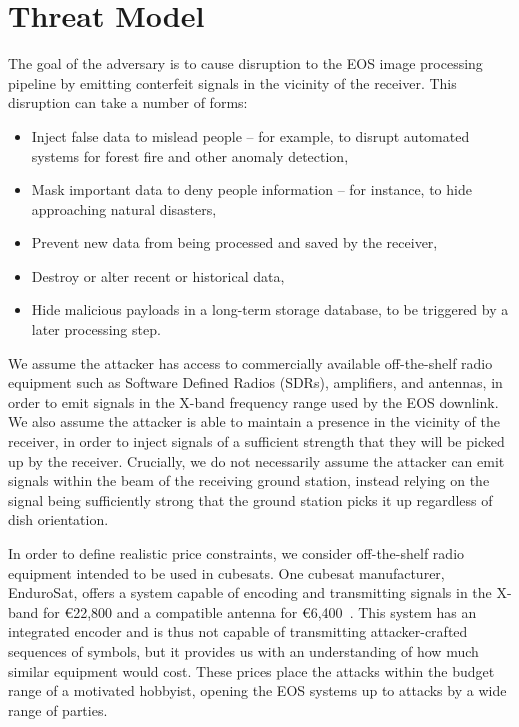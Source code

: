 \section{Threat Model}\label{sec:threat-model}

The goal of the adversary is to cause disruption to the EOS image processing pipeline by emitting conterfeit signals in the vicinity of the receiver.
This disruption can take a number of forms:
\begin{itemize}
    \item Inject false data to mislead people -- for example, to disrupt automated systems for forest fire and other anomaly detection,
    \item Mask important data to deny people information -- for instance, to hide approaching natural disasters,
    \item Prevent new data from being processed and saved by the receiver,
    \item Destroy or alter recent or historical data,
    \item Hide malicious payloads in a long-term storage database, to be triggered by a later processing step.
\end{itemize}

We assume the attacker has access to commercially available off-the-shelf radio equipment such as Software Defined Radios (SDRs), amplifiers, and antennas, in order to emit signals in the X-band frequency range used by the EOS downlink.
We also assume the attacker is able to maintain a presence in the vicinity of the receiver, in order to inject signals of a sufficient strength that they will be picked up by the receiver.
Crucially, we do not necessarily assume the attacker can emit signals within the beam of the receiving ground station, instead relying on the signal being sufficiently strong that the ground station picks it up regardless of dish orientation.

In order to define realistic price constraints, we consider off-the-shelf radio equipment intended to be used in cubesats.
One cubesat manufacturer, EnduroSat, offers a system capable of encoding and transmitting signals in the X-band for €22,800 and a compatible antenna for €6,400~\cite{endurosat:xbandtransmitter,endurosat:xbandantenna}.
This system has an integrated encoder and is thus not capable of transmitting attacker-crafted sequences of symbols, but it provides us with an understanding of how much similar equipment would cost.
These prices place the attacks within the budget range of a motivated hobbyist, opening the EOS systems up to attacks by a wide range of parties.

